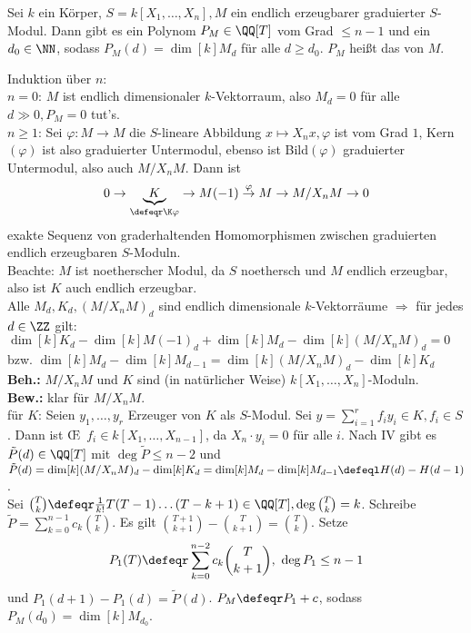 \begin{Satz}
\label{Satz6}
  Sei $k$ ein Körper, $S=k[X_1, \dots, X_n], M$ ein endlich erzeugbarer
  graduierter $S$-Modul. Dann gibt es ein Polynom $P_M \in \QQ[T]$ vom
  Grad $\le n -1 $ und ein $d_0 \in \NN$, sodass $P_M(d) = \dim[k]{M_d}$ für alle $d \ge d_0$. $P_M$ heißt das
   von $M$.
\end{Satz}

\begin{Bew}
  Induktion über $n$:\\
  $n=0$: $M$ ist endlich dimensionaler $k$-Vektorraum, also $M_d=0$ für alle $d
  \gg 0, P_M = 0$ tut's.\\
  $n\geq 1$: Sei $\varphi: M \to M$ die $S$-lineare Abbildung $x \mapsto X_n x,
  \varphi$ ist vom Grad $1$, Kern$(\varphi)$ ist also graduierter Untermodul,
  ebenso ist Bild$(\varphi)$ graduierter Untermodul, also auch $M/X_n M$.
  Dann ist
  \[
  0 \to \underset{\defeqr\K \varphi}{\underbrace{K}} \to M(-1) \overset{\varphi}{\to}
  M \to M/X_n M \to 0
  \]
  exakte Sequenz von graderhaltenden Homomorphismen zwischen graduierten\\
  endlich erzeugbaren $S$-Moduln.\\
  Beachte: $M$ ist noetherscher Modul, da $S$ noethersch und $M$ endlich
  erzeugbar, also ist $K$ auch endlich erzeugbar.\\
  Alle $M_d, K_d,(M/X_n M)_d$ sind endlich dimensionale $k$-Vektorräume
  $\Rightarrow$ für jedes $d \in \ZZ$ gilt: $\dim[k]{K_d} -
  \dim[k]{M(-1)_d} + \dim[k]{M_d} - \dim[k]{(M/X_n M)_d} = 0$
  bzw. $\dim[k]{M_d} - \dim[k]{M_{d-1}} = \dim[k]{(M/X_n M)_d}
  - \dim[k]{K_d}$\\
  \textbf{Beh.:} $M/X_n M$ und $K$ sind (in natürlicher Weise) $k[X_1, \dots,
  X_n]$-Moduln.\\
  \textbf{Bew.:} klar für $M/X_n M$.\\
  für $K$: Seien $y_1, \dots, y_r$ Erzeuger von $K$ als $S$-Modul. Sei $y =
  \sum_{i = 1}^r f_i y_i \in K, f_i \in S$.
  Dann ist \OE\ $f_i \in k[X_1, \dots, X_{n-1}]$, da $X_n \cdot y_i = 0$ für
  alle $i$. Nach IV gibt es $\tilde{P}(d) \in \QQ[T]$ mit $\deg{\tilde{P}}
  \le n-2$ und $\tilde{P}(d) = \dim[k]{(M/X_n M)_d} - \dim[k]{K_d} =
  \dim[k]{M_d} - \dim[k]{M_{d-1}} \defeql H(d) - H(d-1)$.\\
  Sei $\binom{T}{k} \defeqr \frac{1}{k!} T (T-1) \dots (T-k+1) \in
  \QQ[T], \deg{\binom{T}{k}} = k$.
  Schreibe $\tilde{P} = \sum_{k = 0}^{n-1} c_k \binom{T}{k}$. Es gilt
  $\binom{T+1}{k+1} - \binom{T}{k+1} = \binom{T}{k}$. Setze
  \[
  P_1(T) \defeqr \sum_{k=0}^{n-2} c_k \binom{T}{k+1},\ \deg{P_1} \le n-1
  \]
  und $P_1(d+1)-P_1(d) = \tilde{P}(d)$. $P_M \defeqr P_1 +c$, sodass $P_M(d_0) =
  \dim[k]{M_{d_0}}$.
\end{Bew}

